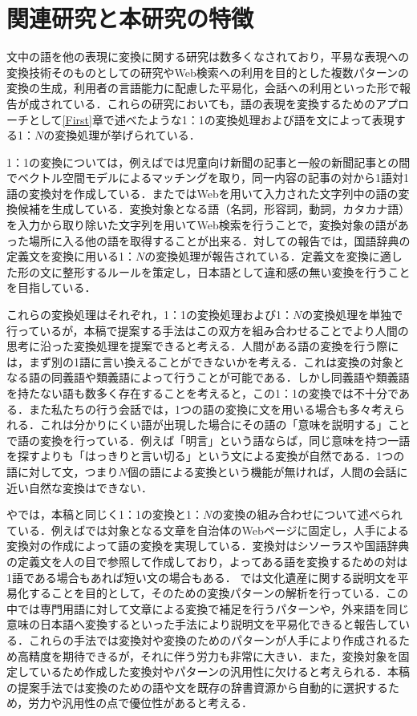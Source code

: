 \documentclass[japanese]{jnlp_1.4}
\begin{document}
\section{関連研究と本研究の特徴}
\label{Second}

文中の語を他の表現に変換に関する研究は数多くなされており，平易な表現への変換技術そのものとしての研究\cite{Article_02}やWeb検索への利用を目的とした複数パターンの変換の生成\cite{Article_13}，利用者の言語能力に配慮した平易化\cite{Article_01,Article_12,Article_16}，会話への利用\cite{Article_15}といった形で報告が成されている．これらの研究においても，語の表現を変換するためのアプローチとして\ref{First}章で述べたような1：1の変換処理および語を文によって表現する1：{$N$}の変換処理が挙げられている．

1：1の変換については，例えば\cite{Article_01}では児童向け新聞の記事と一般の新聞記事との間でベクトル空間モデルによるマッチングを取り，同一内容の記事の対から1語対1語の変換対を作成している．また\cite{Article_13}ではWebを用いて入力された文字列中の語の変換候補を生成している．変換対象となる語（名詞，形容詞，動詞，カタカナ語）を入力から取り除いた文字列を用いてWeb検索を行うことで，変換対象の語があった場所に入る他の語を取得することが出来る．対して\cite{Article_02}の報告では，国語辞典の定義文を変換に用いる1：$N$の変換処理が報告されている．定義文を変換に適した形の文に整形するルールを策定し，日本語として違和感の無い変換を行うことを目指している．

これらの変換処理はそれぞれ，1：1の変換処理および1：$N$の変換処理を単独で行っているが，本稿で提案する手法はこの双方を組み合わせることでより人間の思考に沿った変換処理を提案できると考える．人間がある語の変換を行う際には，まず別の1語に言い換えることができないかを考える．これは変換の対象となる語の同義語や類義語によって行うことが可能である．しかし同義語や類義語を持たない語も数多く存在することを考えると，この1：1の変換では不十分である．また私たちの行う会話では，1つの語の変換に文を用いる場合も多々考えられる．これは分かりにくい語が出現した場合にその語の「意味を説明する」ことで語の変換を行っている．例えば「明言」という語ならば，同じ意味を持つ一語を探すよりも「はっきりと言い切る」という文による変換が自然である．1つの語に対して文，つまり$N$個の語による変換という機能が無ければ，人間の会話に近い自然な変換はできない．

\cite{Article_12}や\cite{Article_16}では，本稿と同じく1：1の変換と1：$N$の変換の組み合わせについて述べられている．例えば\cite{Article_12}では対象となる文章を自治体のWebページに固定し，人手による変換対の作成によって語の変換を実現している．変換対はシソーラスや国語辞典の定義文を人の目で参照して作成しており，よってある語を変換するための対は1語である場合もあれば短い文の場合もある． \cite{Article_16}では文化遺産に関する説明文を平易化することを目的として，そのための変換パターンの解析を行っている．この中では専門用語に対して文章による変換で補足を行うパターンや，外来語を同じ意味の日本語へ変換するといった手法により説明文を平易化できると報告している．これらの手法では変換対や変換のためのパターンが人手により作成されるため高精度を期待できるが，それに伴う労力も非常に大きい．また，変換対象を固定しているため作成した変換対やパターンの汎用性に欠けると考えられる．本稿の提案手法では変換のための語や文を既存の辞書資源から自動的に選択するため，労力や汎用性の点で優位性があると考える．
\end{document}

